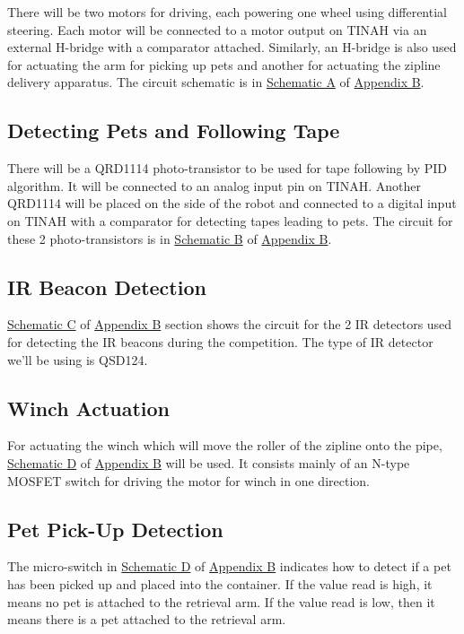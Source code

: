 \documentclass[11pt, oneside]{article} %
\begin{document}
	There will be two motors for driving, each powering one wheel using differential steering. Each motor will be connected to a motor output on TINAH via an external H-bridge with a comparator attached. Similarly, an H-bridge is also used for actuating the arm for picking up pets and another for actuating the zipline delivery apparatus. The circuit schematic is in \hyperref[sch:A]{Schematic A} of \hyperref[appendixB]{Appendix B}.
	
	\subsection{Detecting Pets and Following Tape}
	
	There will be a QRD1114 photo-transistor to be used for tape following by PID algorithm. It will be connected to an analog input pin on TINAH. Another QRD1114 will be placed on the side of the robot and connected to a digital input on TINAH with a comparator for detecting tapes leading to pets. The circuit for these 2 photo-transistors is in \hyperref[sch:B]{Schematic B} of \hyperref[appendixB]{Appendix B}. 
	
	\subsection{IR Beacon Detection}
	
	\hyperref[sch:C]{Schematic C} of \hyperref[appendixB]{Appendix B} section shows the circuit for the 2 IR detectors used for detecting the IR beacons during the competition. The type of IR detector we'll be using is QSD124. 
	
	\subsection{Winch Actuation}
	
	For actuating the winch which will move the roller of the zipline onto the pipe, \hyperref[sch:D]{Schematic D} of \hyperref[appendixB]{Appendix B} will be used. It consists mainly of an N-type MOSFET switch for driving the motor for winch in one direction. 
	
	\subsection{Pet Pick-Up Detection}
	
	The micro-switch in \hyperref[sch:E]{Schematic D} of \hyperref[appendixB]{Appendix B} indicates how to detect if a pet has been picked up and placed into the container. If the value read is high, it means no pet is attached to the retrieval arm. If the value read is low, then it means there is a pet attached to the retrieval arm. 
	
\end{document}
